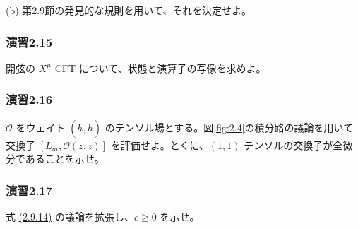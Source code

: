 \noindent
(b) 第2.9節の発見的な規則を用いて、それを決定せよ。

\medskip
\subsubsection*{演習2.15}\label{ex:2.15}
開弦の $X^\mu$ CFT について、状態と演算子の写像を求めよ。

\medskip
\subsubsection*{演習2.16}\label{ex:2.16}
$\mathcal O$ をウェイト $(h,\widetilde h)$ のテンソル場とする。図\ref{fig:2.4}の積分路の議論を用いて交換子 $[L_m,\mathcal O(z,\bar z)]$ を評価せよ。とくに、$(1,1)$ テンソルの交換子が全微分であることを示せ。

\medskip
\subsubsection*{演習2.17}\label{ex:2.17}
式 \hyperref[eq:2.9.14]{(2.9.14)} の議論を拡張し、$c\geq0$ を示せ。
